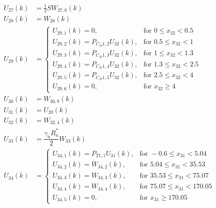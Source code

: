 \begin{align} \label{eq:allRecRel3}
\begin{split}
U_{27} \left(k\right)&= \frac{1}{2}SW_{27,6}\left(k\right) \\
U_{28} \left(k\right)&= W_{28}\left(k\right) \\
U_{29} \left(k\right)&=\begin{cases}
U_{29,1}\left(k\right)=0, & \text{for } 0\leq x_{32} < 0.5\\
U_{29,2}\left(k\right)=P_{C_{D} 1,2}U_{32}\left(k\right), &  \text{for } 0.5\leq x_{32} < 1 \\
U_{29,3}\left(k\right)=P_{C_{D} 1,3}U_{32}\left(k\right), &  \text{for } 1\leq x_{32} < 1.3 \\
U_{29,4}\left(k\right)=P_{C_{D} 1,4}U_{32}\left(k\right), &  \text{for } 1.3\leq x_{32} < 2.5 \\
U_{29,5}\left(k\right)=P_{C_{D} 1,5}U_{32}\left(k\right), &  \text{for } 2.5\leq x_{32} < 4 \\
U_{29,6}\left(k\right)=0, &  \text{for } x_{32} \geq 4 
\end{cases}\\
U_{30} \left(k\right)&=W_{30,9}\left(k\right) \\
U_{31} \left(k\right)&= U_{20}\left(k\right)\\
U_{32} \left(k\right)&= W_{32,4}\left(k\right)\\
U_{33} \left(k\right)&= \dfrac{\gamma_{a}R_{a}^{*}}{2}W_{33}\left(k\right) \\
U_{34}\left(k\right)&=\begin{cases}
U_{34,1}\left(k\right)=P_{T 1,1}U_{31}\left(k\right), & \text{for } -0.6 \leq x_{31} < 5.04  \\
U_{34,2}\left(k\right)=W_{34,2}\left(k\right), &  \text{for } 5.04\leq x_{31} < 35.53   \\
U_{34,3}\left(k\right)=W_{34,3}\left(k\right), &  \text{for } 35.53\leq x_{31} < 75.07   \\
U_{34,4}\left(k\right)=W_{34,4}\left(k\right), &  \text{for } 75.07\leq x_{31} < 170.05   \\
U_{34,5}\left(k\right)=0, &  \text{for }  x_{31} \geq 170.05   
\end{cases}
\end{split}
\end{align}

